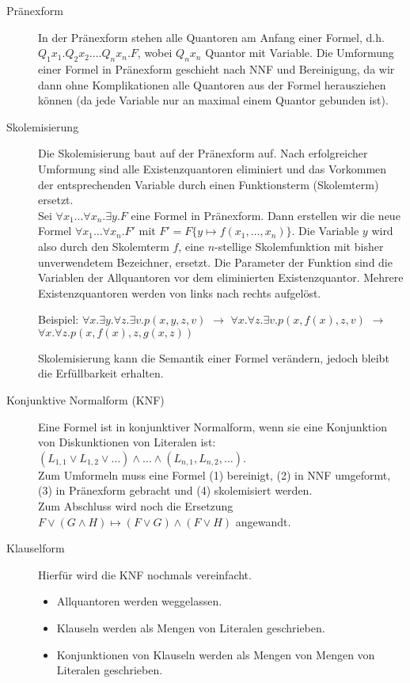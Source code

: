 \begin{description}
        \item[Pränexform] In der Pränexform stehen alle Quantoren am Anfang einer Formel, d.h. $Q_{1}x_{1}.Q_{2}x_{2}.\dots Q_{n}x_{n}.F$, wobei $Q_{n}x_{n}$ Quantor mit Variable. Die Umformung einer Formel in Pränexform geschieht nach NNF und Bereinigung, da wir dann ohne Komplikationen alle Quantoren aus der Formel herausziehen können (da jede Variable nur an maximal einem Quantor gebunden ist). 

        \item[Skolemisierung] Die Skolemisierung baut auf der Pränexform auf. Nach erfolgreicher Umformung sind alle Existenzquantoren eliminiert und das Vorkommen der entsprechenden Variable durch einen Funktionsterm (Skolemterm) ersetzt. \\
            Sei $\forall x_{1}\dots \forall x_{n}. \exists y.F$ eine Formel in Pränexform.
            Dann erstellen wir die neue Formel $\forall x_{1} \dots \forall x_{n}.F'$ mit $F' = F\{y \mapsto f(x_{1},\dots,x_{n})\}$. Die Variable $y$ wird also durch den Skolemterm $f$, eine $n$-stellige Skolemfunktion mit bisher unverwendetem Bezeichner, ersetzt.
            Die Parameter der Funktion sind die Variablen der Allquantoren vor dem eliminierten Existenzquantor.
            Mehrere Existenzquantoren werden von links nach rechts aufgelöst.

            Beispiel: $\forall x. \exists y. \forall z. \exists v.p(x,y,z,v)$ $\longrightarrow$
            $\forall x. \forall z. \exists v.p(x, f(x), z, v)$ $\longrightarrow$
            $\forall x. \forall z.p(x, f(x), z, g(x,z))$

            Skolemisierung kann die Semantik einer Formel verändern, jedoch bleibt die Erfüllbarkeit erhalten.

        \item[Konjunktive Normalform (KNF)] Eine Formel ist in konjunktiver Normalform, wenn sie eine Konjunktion von Diskunktionen von Literalen ist:
            $(L_{1,1} \lor L_{1,2} \lor \dots) \land \dots \land (L_{n,1}, L_{n,2}, \dots)$. \\
            Zum Umformeln muss eine Formel (1) bereinigt, (2) in NNF umgeformt, (3) in Pränexform gebracht und (4) skolemisiert werden. \\
            Zum Abschluss wird noch die Ersetzung $F \lor (G \land H) \mapsto (F \lor G) \land (F \lor H)$ angewandt.

        \item[Klauselform] Hierfür wird die KNF nochmals vereinfacht.
            \begin{itemize}
                \item Allquantoren werden weggelassen.
                \item Klauseln werden als Mengen von Literalen geschrieben.
                \item Konjunktionen von Klauseln werden als Mengen von Mengen von Literalen geschrieben.
            \end{itemize}

    \end{description}

